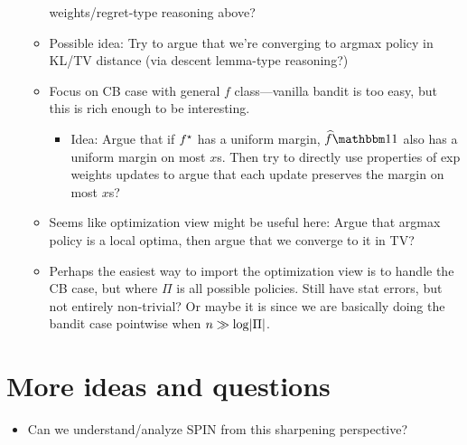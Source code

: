 \documentclass{article}
\begin{document}
\begin{itemize}
\begin{itemize}
    weights/regret-type reasoning above?
  \item Possible idea: Try to argue that we're converging to argmax
    policy in KL/TV distance (via descent lemma-type reasoning?)
  \item Focus on CB case with general $f$ class---vanilla bandit is
    too easy, but this is rich enough to be interesting.
    \begin{itemize}
    \item Idea: Argue that if $f^{\star}$ has a uniform margin,
      $\fhat\ind{1}$ also has a uniform margin on most $x$s. Then try
      to directly use properties of exp weights updates to argue that
      each update preserves the margin on most $x$s?
    \end{itemize}
  \item Seems like optimization view might be useful here: Argue that
    argmax policy is a local optima, then argue that we converge to it
    in TV? 
  \item Perhaps the easiest way to import the optimization view is to
    handle the CB case, but where $\Pi$ is all possible
    policies. Still have stat errors, but not entirely non-trivial? Or
    maybe it is since we are basically doing the bandit case pointwise
    when $n\gg\log\lvert\Pi\rvert$.
  \end{itemize}
\end{itemize}

\section{More ideas and questions}
\begin{itemize}
\item Can we understand/analyze SPIN from this sharpening perspective?
\end{itemize}

 
\end{document}
